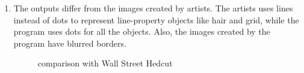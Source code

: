 \documentclass[11pt]{article}
\begin{document}
\begin{enumerate}
  \item The outputs differ from the images created by artists. The artists uses lines instead of dots to represent line-property objects like hair and grid, while the program uses dots for all the objects. Also, the images created by the program have blurred borders.
  \begin{figure}[h!]
      \centering
      \qquad
      \qquad
      \qquad
      \caption{comparison with Wall Street Hedcut}
      \label{fig:klayman-hedcuter}
  \end{figure}
\end{enumerate}
\end{document}
